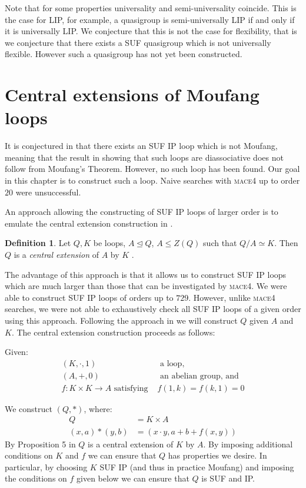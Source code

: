 \documentclass[12pt]{report}
\theoremstyle{definition}
\newtheorem{dfn}[thm]{Definition}
\newcommand{\rdv}{/}                %
\begin{document}
Note that for some properties universality and semi-universality coincide. This is the case for LIP,
  for example, a quasigroup is semi-universally LIP if and only if it is universally LIP. We conjecture that
  this is not the case for flexibility, that is we conjecture that there exists a SUF quasigroup
  which is not universally flexible. However such a quasigroup has not yet been constructed.

\section{Central extensions of Moufang loops}

It is conjectured in \cite{SUF} that there exists an SUF IP loop which is not Moufang, meaning that
  the result in \cite{SUF} showing that such loops are diassociative does not follow from Moufang's
  Theorem. However, no such loop has been found. Our goal in this chapter is to construct such a loop.
  Naive searches with \textsc{mace4} up to order $20$ were unsuccessful.

An approach allowing the constructing of SUF IP loops of larger order is to emulate the central
  extension construction in \cite{64and81}.

\begin{dfn}
  Let $Q, K$ be loops, $A\unlhd Q$, $A\leq Z(Q)$ such that $Q\rdv A\simeq K$. Then $Q$ is
    a \emph{central extension} of $A$ by $K$ \cite{64and81}.
\end{dfn}

The advantage of this approach is that it allows us to construct SUF IP loops which are much
  larger than those that can be investigated by \textsc{mace4}. We were able to construct SUF IP loops
  of orders up to $729$. However, unlike \textsc{mace4} searches, we were not able to exhaustively check
  all SUF IP loops of a given order using this approach. Following the approach in \cite{64and81}
  we will construct $Q$ given $A$ and $K$. The central extension construction proceeds as follows:

Given:
  \begin{align*}
    (K, \cdot, 1) &\text{ a loop,}\\
    (A, +, 0) &\text{ an abelian group, and}\\
    f:K\times K\to A\text{ satisfying } &f(1, k) = f(k, 1) = 0 
  \end{align*}

We construct $(Q, *)$, where:
  \begin{align*}
    Q  &= K\times A\\
    (x, a)*(y, b) &= (x\cdot y, a + b + f(x, y))
  \end{align*}
By Proposition 5 in \cite{64and81} $Q$ is a central extension of $K$ by $A$. By imposing additional
  conditions on $K$ and $f$ we can ensure that $Q$ has properties we desire. In particular, by
  choosing $K$ SUF IP (and thus in practice Moufang) and imposing the conditions on $f$ given below
  we can ensure that $Q$ is SUF and IP.
\end{document}
